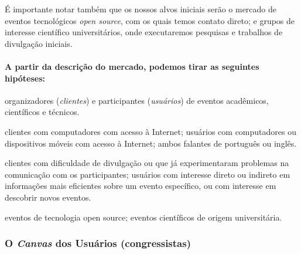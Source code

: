 \documentclass[12pt,a4paper,twoside,hyphens,english,brazil]{abntex2}
\newcommand{\hip}{{\color{BlueViolet}\framebox[1.1\width]{HIP}}}
\begin{document}

É importante notar também que os nossos alvos iniciais serão o mercado de eventos tecnológicos \emph{open source}, com os quais temos contato direto; e grupos de interesse científico universitários, onde executaremos pesquisas e trabalhos de divulgação iniciais.

\paragraph*{A partir da descrição do mercado, podemos tirar as seguintes hipóteses:}
\begin{description}[itemsep=-1ex]
	\item[Mercado] organizadores (\textit{clientes}) e participantes (\textit{usuários}) de eventos acadêmicos, científicos e técnicos.
	\item[Mercado disponível] clientes com computadores com acesso à Internet; usuários com computadores ou dispositivos móveis com acesso à Internet; ambos falantes de português ou inglês.
	\item[Mercado-alvo] clientes com dificuldade de divulgação ou que já experimentaram problemas na comunicação com os participantes; usuários com interesse direto ou indireto em informações mais eficientes sobre um evento específico, ou com interesse em descobrir novos eventos.
	\item[Mercado-alvo primário] eventos de tecnologia open source; eventos científicos de origem universitária.
\end{description}


\iffalse %
\subsubsection*{O \emph{Canvas} dos Usuários (congressistas)}
\end{document}
